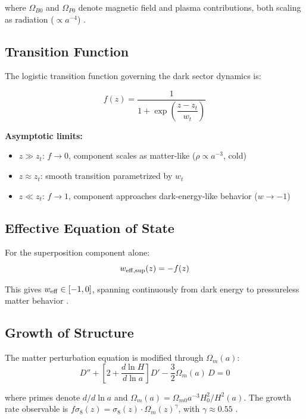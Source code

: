\documentclass[11pt,a4paper]{article}
\begin{document}
\noindent where $\Omega_{B0}$ and $\Omega_{P0}$ denote magnetic field and plasma contributions, both scaling as radiation ($\propto a^{-4}$) \cite{planck2020}.

\subsection{Transition Function}

The logistic transition function governing the dark sector dynamics is:

\begin{equation}
f(z) = \frac{1}{1 + \exp\!\left(\dfrac{z - z_t}{w_t}\right)}
\label{eq:fz}
\end{equation}

\noindent \textbf{Asymptotic limits:}
\begin{itemize}
  \item $z \gg z_t$: $f \to 0$, component scales as matter-like ($\rho \propto a^{-3}$, cold)
  \item $z \approx z_t$: smooth transition parametrized by $w_t$
  \item $z \ll z_t$: $f \to 1$, component approaches dark-energy-like behavior ($w\to -1$)
\end{itemize}

\subsection{Effective Equation of State}

For the superposition component alone:
\begin{equation}
w_{\rm eff,sup}(z) = -f(z)
\label{eq:weff}
\end{equation}

This gives $w_{\rm eff} \in [-1, 0]$, spanning continuously from dark energy to pressureless matter behavior \cite{trotta2008}.

\subsection{Growth of Structure}

The matter perturbation equation is modified through $\Omega_m(a)$:
\begin{equation}
D'' + \left[2 + \frac{d\ln H}{d\ln a}\right]D' - \frac{3}{2}\Omega_m(a)\,D = 0
\label{eq:growth}
\end{equation}

\noindent where primes denote $d/d\ln a$ and $\Omega_m(a) = \Omega_{m0}a^{-3}H_0^2/H^2(a)$.
The growth rate observable is $f\sigma_8(z) = \sigma_8(z) \cdot \Omega_m(z)^\gamma$, with $\gamma \approx 0.55$ \cite{boss2017}.
\end{document}
